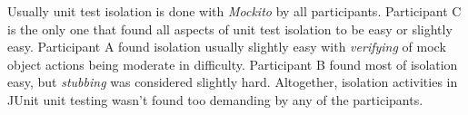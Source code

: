 Usually unit test isolation is done with \textit{Mockito} by all participants. Participant C is the only
one that found all aspects of unit test isolation to be easy or slightly easy. Participant A found isolation
usually slightly easy with \textit{verifying} of mock object actions being moderate in difficulty. Participant B
found most of isolation easy, but \textit{stubbing} was considered slightly hard. Altogether, isolation activities in JUnit unit testing
wasn't found too demanding by any of the participants.

    \begin{table}[H]
\end{table}
